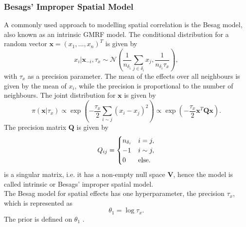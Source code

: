 \subsubsection{Besags' Improper Spatial Model}
A commonly used approach to modelling spatial correlation is the Besag model, also known as an intrinsic GMRF model. The conditional distribution for a random vector $\pmb{x}=\left(x_1,...,x_n\right)^T$ is given by
\begin{equation}
    x_i|\pmb{x}_{-i},\tau_x\sim\mathcal{N}\left(\frac{1}{n_{\delta_i}}\sum_{j\in\delta_i}x_j,\frac{1}{n_{\delta_i}\tau_x}\right),
\end{equation}
with $\tau_x$ as a precision parameter. The mean of the effects over all neighbours is given by the mean of $x_i$, while the precision is proportional to the number of neighbours. The joint distribution for $\pmb{x}$ is given by
\begin{equation}
    \pi\left(\pmb{x}|\tau_x\right)\propto\exp\left(-\frac{\tau_x}{2}\sum_{i\sim j}\left(x_i-x_j\right)^2\right)\propto\exp\left(-\frac{\tau_x}{2}\pmb{x}^T\pmb{Q}\pmb{x}\right).
\end{equation}
The precision matrix $\pmb{Q}$ is given by
\begin{equation}
    Q_{ij}=\begin{cases}
    n_{\delta_i}&i=j,\\
    -1&i\sim j,\\
    0&\hbox{else.}
    \end{cases}
\end{equation}
 is a singular matrix, i.e. it has a non-empty null space $\pmb{V}$, hence the model is called intrinsic or Besags' improper spatial model. \\
The Besag model for spatial effects has one hyperparameter, the precision $\tau_x$, which is represented as
\begin{equation}
    \theta_1 = \log\tau_x.
\end{equation}
The prior is defined on $\theta_1$ \autocite[][]{besag1974spatial, riebler2016intuitive}.

